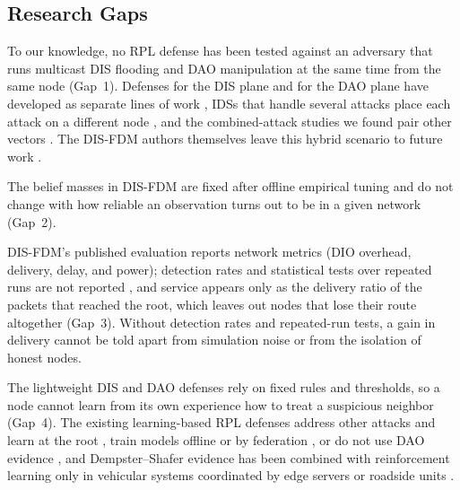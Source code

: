 \subsection{Research Gaps}\label{sec:gaps}
To our knowledge, no RPL defense has been tested against an adversary that runs multicast DIS flooding and DAO manipulation at the same time from the same node (Gap~1). Defenses for the DIS plane and for the DAO plane have developed as separate lines of work \cite{vermaranga2020,medjek2021,prajisha2025,limsd2024}, IDSs that handle several attacks place each attack on a different node \cite{garciaribera2022,imdrpl2023}, and the combined-attack studies we found pair other vectors \cite{alsukayti2023,de2rarpl2024,abdulkareem2024}. The DIS-FDM authors themselves leave this hybrid scenario to future work \cite{prajisha2025}.

The belief masses in DIS-FDM are fixed after offline empirical tuning and do not change with how reliable an observation turns out to be in a given network (Gap~2).

DIS-FDM's published evaluation reports network metrics (DIO overhead, delivery, delay, and power); detection rates and statistical tests over repeated runs are not reported \cite{prajisha2025}, and service appears only as the delivery ratio of the packets that reached the root, which leaves out nodes that lose their route altogether (Gap~3). Without detection rates and repeated-run tests, a gain in delivery cannot be told apart from simulation noise or from the isolation of honest nodes.

The lightweight DIS and DAO defenses rely on fixed rules and thresholds, so a node cannot learn from its own experience how to treat a suspicious neighbor (Gap~4). The existing learning-based RPL defenses address other attacks and learn at the root \cite{itrpl2024,haqdad2026}, train models offline or by federation \cite{ahmadi2026,panda2026}, or do not use DAO evidence \cite{qsecrpl2023,azzaoui2024}, and Dempster--Shafer evidence has been combined with reinforcement learning only in vehicular systems coordinated by edge servers or roadside units \cite{gyawali2021,jasti2024}.
